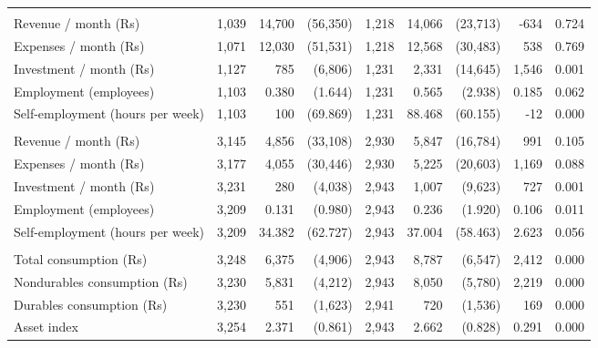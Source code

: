 \begin{table}[H]
{\begin{tabular}{lrrrrrrrr}
\addlinespace[0.3em]
\multicolumn{9}{l}{\textbf{Businesses}}\\
\hspace{1em}Revenue / month (Rs) & 1,039 & 14,700 & (56,350) & 1,218 & 14,066 & (23,713) & -634 & 0.724\\
\hspace{1em}Expenses / month (Rs) & 1,071 & 12,030 & (51,531) & 1,218 & 12,568 & (30,483) & 538 & 0.769\\
\hspace{1em}Investment / month (Rs) & 1,127 & 785 & (6,806) & 1,231 & 2,331 & (14,645) & 1,546 & 0.001\\
\hspace{1em}Employment (employees) & 1,103 & 0.380 & (1.644) & 1,231 & 0.565 & (2.938) & 0.185 & 0.062\\
\hspace{1em}Self-employment (hours per week) & 1,103 & 100 & (69.869) & 1,231 & 88.468 & (60.155) & -12 & 0.000\\
\addlinespace[0.3em]
\multicolumn{9}{l}{\textbf{Businesses (all households)}}\\
\hspace{1em}Revenue / month (Rs) & 3,145 & 4,856 & (33,108) & 2,930 & 5,847 & (16,784) & 991 & 0.105\\
\hspace{1em}Expenses / month (Rs) & 3,177 & 4,055 & (30,446) & 2,930 & 5,225 & (20,603) & 1,169 & 0.088\\
\hspace{1em}Investment / month (Rs) & 3,231 & 280 & (4,038) & 2,943 & 1,007 & (9,623) & 727 & 0.001\\
\hspace{1em}Employment (employees) & 3,209 & 0.131 & (0.980) & 2,943 & 0.236 & (1.920) & 0.106 & 0.011\\
\hspace{1em}Self-employment (hours per week) & 3,209 & 34.382 & (62.727) & 2,943 & 37.004 & (58.463) & 2.623 & 0.056\\
\addlinespace[0.3em]
\multicolumn{9}{l}{\textbf{Consumption (per household per month)}}\\
\hspace{1em}Total consumption (Rs) & 3,248 & 6,375 & (4,906) & 2,943 & 8,787 & (6,547) & 2,412 & 0.000\\
\hspace{1em}Nondurables consumption (Rs) & 3,230 & 5,831 & (4,212) & 2,943 & 8,050 & (5,780) & 2,219 & 0.000\\
\hspace{1em}Durables consumption (Rs) & 3,230 & 551 & (1,623) & 2,941 & 720 & (1,536) & 169 & 0.000\\
\hspace{1em}Asset index & 3,254 & 2.371 & (0.861) & 2,943 & 2.662 & (0.828) & 0.291 & 0.000\\
\bottomrule
\end{tabular}}
\end{table}
